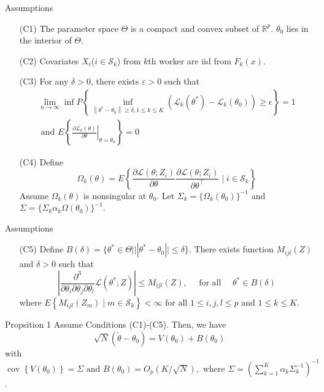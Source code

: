 \documentclass[11pt]{beamer}
\begin{document}
\begin{frame}{Assumptions}
\begin{itemize}
\item[(C1)] The parameter space $\Theta$ is a compact and convex subset of $\mathbb{R}^p$. $\theta_0$ lies in the interior of $\Theta$.
\item[(C2)] Covariates $X_i$($i\in \mathcal{S}_k$) from $k$th worker are iid from $F_k(x)$.
\item[(C3)] For any $\delta>0$, there exists $\varepsilon>0$ such that
$$
\begin{array}{l}
\lim _{n \rightarrow \infty} \inf P\left\{\inf _{\left\|\theta^{*}-\theta_{0}\right\| \geq \delta, 1 \leq k \leq K}\left(\mathcal{L}_{k}\left(\theta^{*}\right)-\mathcal{L}_{k}\left(\theta_{0}\right)\right) \geq \epsilon\right\}=1 \\
\text { and } E\left\{\left.\frac{\partial \mathcal{L}_{k}(\theta)}{\partial \theta}\right|_{\theta=\theta_{0}}\right\}=0
\end{array}
$$
\item[(C4)]Define
$$
\Omega_{k}(\theta)=E\left\{\frac{\partial \mathcal{L}\left(\theta ; Z_{i}\right)}{\partial \theta} \frac{\partial \mathcal{L}\left(\theta ; Z_{i}\right)}{\partial \theta^{\top}} \mid i \in \mathcal{S}_{k}\right\}
$$
Assume $\Omega_k(\theta)$ is nonsingular at $\theta_0$. Let $\Sigma_k=\{\Omega_k(\theta_0)\}^{-1}$ and $\Sigma=\{\Sigma_k \alpha_k\Omega(\theta_0)\}^{-1}$.
\end{itemize}
\end{frame}

\begin{frame}{Assumptions}
\begin{itemize}
\item[(C5)] Define $B(\delta)=\{\theta^*\in \Theta | ||\theta^*-\theta_0||\le \delta\}$. There exists function $M_{ijl}(Z)$ and $\delta>0$ such that
$$
\left|\frac{\partial^{3}}{\partial \theta_{i} \partial \theta_{j} \partial \theta_{l}} \mathcal{L}\left(\theta^{*} ; Z\right)\right| \leq M_{i j l}(Z), \quad \text { for all } \quad \theta^{*} \in B(\delta)
$$
where $E\left\{M_{i j l}\left(Z_{m}\right) \mid m \in \mathcal{S}_{k}\right\}<\infty \text { for all } 1 \leq i, j, l \leq p \text { and } 1 \leq k \leq K$.
\end{itemize}
\end{frame}

\begin{frame}{Propsition 1}
Assume Conditions (C1)-(C5). Then, we have
$$
\sqrt{N}\left(\widetilde{\theta}-\theta_{0}\right)=V\left(\theta_{0}\right)+B\left(\theta_{0}\right)
$$
with $\operatorname{cov}\left\{V\left(\theta_{0}\right)\right\}=\Sigma \text { and } B\left(\theta_{0}\right)=O_{p}(K / \sqrt{N}), \text { where } \Sigma=\left(\sum_{k=1}^{K} \alpha_{k} \Sigma_{k}^{-1}\right)^{-1}$.
\end{frame}
\end{document}
